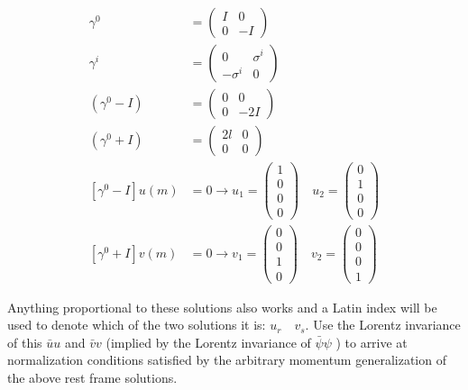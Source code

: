 \documentclass[main.tex]{subfiles}
\begin{document}
\begin{enumerate}
    $$
    \begin{aligned}
    \gamma^0 &= \left(\begin{array}{cc}
    I & 0 \\
    0 & -I
    \end{array}\right) \\
    \gamma^i &= \left(\begin{array}{cc}
    0 & \sigma^i \\
    -\sigma^i & 0
    \end{array}\right)\\
    \left(\gamma^0-I\right) &= \left(\begin{array}{cc}
    0 & 0 \\
    0 & -2 I
    \end{array}\right) \\
    \left(\gamma^0+I\right) &= \left(\begin{array}{ll}
    2 l & 0 \\
    0 & 0
    \end{array}\right) \\
    \left[\gamma^0-I\right] u(m) & =0 \rightarrow u_1=\left(\begin{array}{l}
    1 \\
    0 \\
    0 \\
    0
    \end{array}\right) \quad u_2=\left(\begin{array}{l}
    0 \\
    1 \\
    0 \\
    0
    \end{array}\right) \\
    \left[\gamma^0+I\right] v(m) & =0 \rightarrow v_1=\left(\begin{array}{l}
    0 \\
    0 \\
    1 \\
    0
    \end{array}\right) \quad v_2=\left(\begin{array}{l}
    0 \\
    0 \\
    0 \\
    1
    \end{array}\right)
    \end{aligned}
    $$

    Anything proportional to these solutions also works and a Latin index will be used to denote which of the two solutions it is: $u_r \quad v_s$. Use the Lorentz invariance of this $\bar{u} u$ and $\bar{v} v$ (implied by the Lorentz invariance of $\bar{\psi} \psi$ ) to arrive at normalization conditions satisfied by the arbitrary momentum generalization of the above rest frame solutions. 


\end{enumerate}
\end{document}
